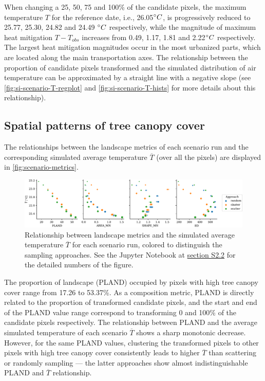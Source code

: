 \documentclass[10pt,letterpaper]{article}
\begin{document}
When changing a 25, 50, 75 and 100\% of the candidate pixels, the maximum temperature $T$ for the reference date, i.e., 26.05$\degree C$, is progressively reduced to 25.77, 25.30, 24.82 and 24.49 $\degree C$ respectively, while the magnitude of maximum heat mitigation $T - T_{obs}$ increases from 0.49, 1.17, 1.81 and 2.22$\degree C$ respectively.
The largest heat mitigation magnitudes occur in the most urbanized parts, which are located along the main transportation axes.
The relationship between the proportion of candidate pixels transformed and the simulated distribution of air temperature can be approximated by a straight line with a negative slope (see \autoref{fig:si-scenario-T-regplot} and \autoref{fig:si-scenario-T-hists} for more details about this relationship).


\subsection*{Spatial patterns of tree canopy cover}

The relationships between the landscape metrics of each scenario run and the corresponding simulated average temperature $\overline{T}$ (over all the pixels) are displayed in \autoref{fig:scenario-metrics}.
\begin{figure}
  \begin{adjustwidth}{-.4\textwidth}{0cm}  
    \includegraphics[width=.99\linewidth]{figures/scenario-metrics}
    \caption{\label{fig:scenario-metrics} Relationship between landscape metrics and the simulated average temperature $\overline{T}$ for each scenario run, colored to distinguish the sampling approaches. See the Jupyter Notebook at \hyperref[sec:si-scenario-metrics]{section S2.2} for the detailed numbers of the figure.}
  \end{adjustwidth}
\end{figure}
The proportion of landscape (PLAND) occupied by pixels with high tree canopy cover range from 17.26 to 53.37\%. As a composition metric, PLAND is directly related to the proportion of transformed candidate pixels, and the start and end of the PLAND value range correspond to transforming 0 and 100\% of the candidate pixels respectively.
The relationship between PLAND and the average simulated temperature of each scenario $\overline{T}$ shows a sharp monotonic decrease. However, for the same PLAND values, clustering the transformed pixels to other pixels with high tree canopy cover consistently leads to higher $\overline{T}$ than scattering or randomly sampling --- the latter approaches show almost indistinguishable PLAND and $\overline{T}$ relationship.
\end{document}
